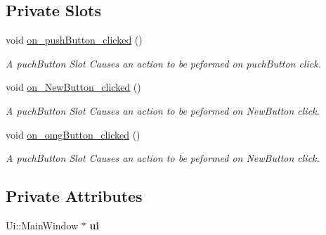 \subsection*{Private Slots}
\begin{DoxyCompactItemize}
\item 
\hypertarget{class_main_window_a4de79c63c7fa0b8d7c468ac71f20be81}{void \hyperlink{class_main_window_a4de79c63c7fa0b8d7c468ac71f20be81}{on\-\_\-push\-Button\-\_\-clicked} ()}\label{class_main_window_a4de79c63c7fa0b8d7c468ac71f20be81}

\begin{DoxyCompactList}\small\item\em A puch\-Button Slot Causes an action to be peformed on puch\-Button click. \end{DoxyCompactList}\item 
\hypertarget{class_main_window_a909c4522b5b472b44a71b522d47cee9b}{void \hyperlink{class_main_window_a909c4522b5b472b44a71b522d47cee9b}{on\-\_\-\-New\-Button\-\_\-clicked} ()}\label{class_main_window_a909c4522b5b472b44a71b522d47cee9b}

\begin{DoxyCompactList}\small\item\em A puch\-Button Slot Causes an action to be peformed on New\-Button click. \end{DoxyCompactList}\item 
\hypertarget{class_main_window_a2ab9ef44717b29fe54ffcc61ee073f34}{void \hyperlink{class_main_window_a2ab9ef44717b29fe54ffcc61ee073f34}{on\-\_\-omg\-Button\-\_\-clicked} ()}\label{class_main_window_a2ab9ef44717b29fe54ffcc61ee073f34}

\begin{DoxyCompactList}\small\item\em A puch\-Button Slot Causes an action to be peformed on New\-Button click. \end{DoxyCompactList}\end{DoxyCompactItemize}
\subsection*{Private Attributes}
\begin{DoxyCompactItemize}
\item 
\hypertarget{class_main_window_a35466a70ed47252a0191168126a352a5}{Ui\-::\-Main\-Window $\ast$ {\bfseries ui}}\label{class_main_window_a35466a70ed47252a0191168126a352a5}

\end{DoxyCompactItemize}


